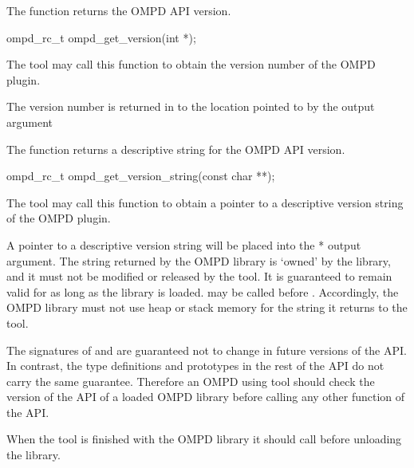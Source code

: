 \summary
The  function returns the OMPD API version.

\format

\cspecificstart
\begin{ompSyntax}
ompd_rc_t ompd_get_version(int *);
\end{ompSyntax}
\cspecificend


\descr
The tool may call this function to obtain the version number of the OMPD plugin.

\argdesc
The version number is returned in to the location pointed to by the  output argument 

\label{ompd:ompd_get_version_string}

\summary
The  function returns a descriptive string for the OMPD API version.

\format

\cspecificstart
\begin{ompSyntax}
ompd_rc_t ompd_get_version_string(const char **);
\end{ompSyntax}
\cspecificend


\descr
The tool may call this function to obtain a pointer to a descriptive version string of the OMPD plugin.

\argdesc
A pointer to a descriptive version string will be placed into the * output argument.
The string returned by the 
OMPD library is `owned' by the library, and it must not be modified or released by the tool.
It is guaranteed to remain valid for as long as the library is loaded. 
may be called before . Accordingly, the OMPD library must not use heap or 
stack memory for the string it returns to the tool.

The signatures of  and  are 
guaranteed not to change in future versions of the API. In contrast, the type definitions and 
prototypes in the rest of the API do not carry the same guarantee. Therefore an OMPD using tool 
should check the version of the API of a loaded OMPD library before calling any other function of 
the API.

\label{ompd:ompd_finalize}

\summary
When the tool is finished with the OMPD library it should call  before 
unloading the library.

